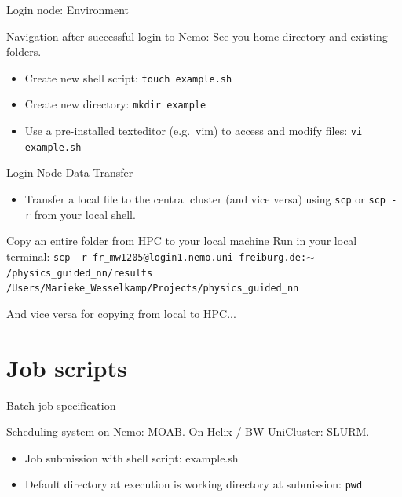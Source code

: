 \documentclass{beamer}
\begin{document}
\begin{frame}{Login node: Environment}

Navigation after successful login to Nemo: See you home directory and existing folders.

\scalebox{0.7}{

}
\vspace{0.6cm}

\begin{itemize}
    \item Create new shell script: \texttt{touch example.sh}
    \item Create new directory: \texttt{mkdir example}
    \item Use a pre-installed texteditor (e.g.~vim) to access and modify files: \texttt{vi example.sh}
\end{itemize}


\end{frame}

\begin{frame}{Login Node Data Transfer}

\begin{itemize}
    \item Transfer a local file to the central cluster (and vice versa) using \texttt{scp} or \texttt{scp -r} from your local shell.
\end{itemize}

\vspace{0.5cm}

\begin{block}{Copy an entire folder from HPC to your local machine}
Run in your local terminal:
\vspace{0.1cm}
\footnotesize
\texttt{scp -r fr\_mw1205@login1.nemo.uni-freiburg.de:$\sim$/physics\_guided\_nn/results /Users/Marieke\_Wesselkamp/Projects/physics\_guided\_nn}
\end{block}
\vspace{0.1cm}

And vice versa for copying from local to HPC...

\end{frame}

\section{Job scripts}


\begin{frame}{Batch job specification}

Scheduling system on Nemo: MOAB. On Helix / BW-UniCluster: SLURM.

\begin{itemize}
    \item Job submission with shell script: example.sh
    \item Default directory at execution is working directory at submission: \texttt{pwd}
\end{itemize}

\end{frame}
\end{document}
